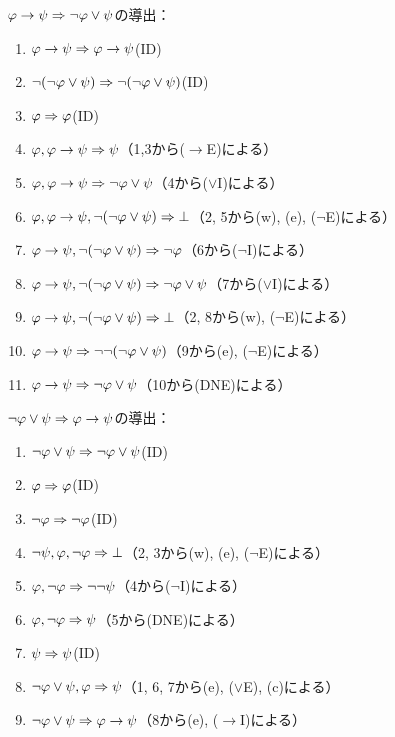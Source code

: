 \(\varphi \to \psi \Rightarrow \lnot \varphi \lor \psi\)の導出：
\begin{enumerate}
	\item \(\varphi \to \psi \Rightarrow \varphi \to \psi\)\quad (ID)
	\item \(\lnot \paren{\lnot \varphi \lor \psi} \sequent \lnot \paren{\lnot \varphi \lor \psi}\)\quad (ID)
	\item \(\varphi \Rightarrow \varphi\)\quad (ID)
	\item \(\varphi, {\varphi \to \psi} \Rightarrow \psi\)\quad （1,3から(\(\to\)E)による）
	\item \(\varphi, {\varphi \to \psi} \Rightarrow \lnot \varphi \lor \psi\)\quad （4から(\(\lor\)I)による）
	\item \(\varphi, {\varphi \to \psi}, \lnot \paren{\lnot \varphi \lor \psi} \sequent \bot\)\quad （2, 5から(w), (e), (\(\lnot\)E)による）
	\item \(\varphi \to \psi, \lnot \paren{\lnot \varphi \lor \psi} \sequent \lnot \varphi\)\quad （6から(\(\lnot\)I)による）
	\item \(\varphi \to \psi, \lnot \paren{\lnot \varphi \lor \psi} \sequent \lnot \varphi \lor \psi\)\quad （7から(\(\lor\)I)による）
	\item \(\varphi \to \psi, \lnot \paren{\lnot \varphi \lor \psi} \sequent \bot\)\quad （2, 8から(w), (\(\lnot\)E)による）
	\item \(\varphi \to \psi \sequent \lnot \lnot \paren{\lnot \varphi \lor \psi}\)\quad （9から(e), (\(\lnot\)E)による）
	\item \(\varphi \to \psi \Rightarrow \lnot \varphi \lor \psi\)\quad （10から(DNE)による）
\end{enumerate}

\(\lnot \varphi \lor \psi \Rightarrow \varphi \to \psi\)の導出：
\begin{enumerate}
	\item \(\lnot \varphi \lor \psi \Rightarrow \lnot \varphi \lor \psi\)\quad (ID)
	\item \(\varphi \Rightarrow \varphi\)\quad (ID)
	\item \(\lnot \varphi \Rightarrow \lnot \varphi\)\quad (ID)
	\item \(\lnot \psi, \varphi, \lnot \varphi \Rightarrow \bot\)\quad （2, 3から(w), (e), (\(\lnot\)E)による）
	\item \(\varphi, \lnot \varphi \Rightarrow \lnot \lnot \psi\)\quad （4から(\(\lnot\)I)による）
	\item \(\varphi, \lnot \varphi \Rightarrow \psi\)\quad （5から(DNE)による）
	\item \(\psi \Rightarrow \psi\)\quad (ID)
	\item \(\lnot \varphi \lor \psi, \varphi \Rightarrow \psi\)\quad （1, 6, 7から(e), (\(\lor\)E), (c)による）
	\item \(\lnot \varphi \lor \psi \Rightarrow \varphi \to \psi\)\quad （8から(e), (\(\to\)I)による）
\end{enumerate}


